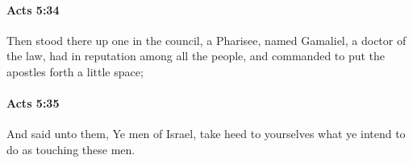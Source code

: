 		\paragraph{Acts 5:34} %
			\label{ACTS-5-34}

			Then stood there up one in the council, a Pharisee, named Gamaliel, a doctor of the law, had in reputation among all the people, and commanded to put the apostles forth a little space;

			\begin{framed}
			\scriptsize
				\begin{compactdesc}
					\item[SBLG] 
				\end{compactdesc}
			\end{framed}

		\paragraph{Acts 5:35} %
			\label{ACTS-5-35}

			And said unto them, Ye men of Israel, take heed to yourselves what ye intend to do as touching these men.

